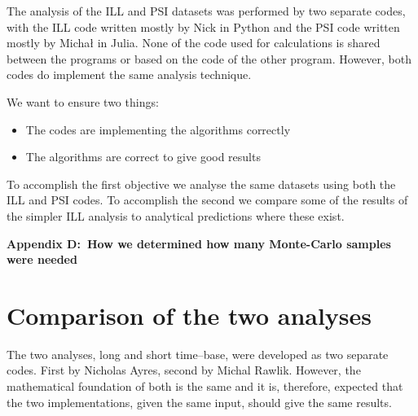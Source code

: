 The analysis of the ILL and PSI datasets was performed by two separate codes, with the ILL code written mostly by Nick in Python and the PSI code written mostly by Michał in Julia. None of the code used for calculations is shared between the programs or based on the code of the other program. However, both codes do implement the same analysis technique.

We want to ensure two things:
\begin{itemize}
\item {The codes are implementing the algorithms correctly}
\item {The algorithms are correct to give good results}
\end{itemize}

To accomplish the first objective we analyse the same datasets using both the ILL and PSI codes. To accomplish the second we compare some of the results of the simpler ILL analysis to analytical predictions where these exist.

\textbf{Appendix D:~How we determined how many Monte-Carlo samples were needed}

\section{Comparison of the two analyses}
\label{Sec:comparison}
The two analyses, long and short time--base, were developed as two separate codes. First by Nicholas Ayres, second by Michal Rawlik. However, the mathematical foundation of both is the same and it is, therefore, expected that the two implementations, given the same input, should give the same results.

